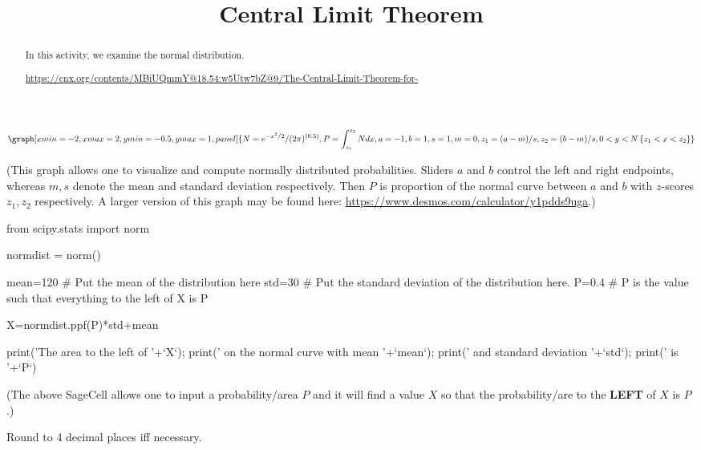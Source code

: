 \documentclass{ximera}
\title{Central Limit Theorem}
\begin{document}
      
\begin{abstract}
      
In this activity, we examine the normal distribution.

\url{https://cnx.org/contents/MBiUQmmY@18.54:w5Utw7bZ@9/The-Central-Limit-Theorem-for-}

      
\end{abstract}
      
\maketitle
 

\begin{onlineOnly}
$$\graph[xmin=-2,xmax=2,ymin=-0.5,ymax=1, panel]{N=e^{-x^2/2}/(2\pi)^{(0.5)}, P=\int_{z_1}^{z_2} N dx, a=-1, b=1, s=1, m=0, z_1=(a-m)/s, z_2=(b-m)/s, 0<y<N\left\{z_1<x<z_2\right\}}$$
\end{onlineOnly}
(This graph allows one to visualize and compute normally distributed probabilities.  Sliders $a$ and $b$ control the left and right endpoints, whereas $m, s$ denote the mean and standard deviation respectively.  Then $P$ is proportion of the normal curve between $a$ and $b$ with $z$-scores $z_1, z_2$ respectively.  A larger version of this graph may be found here: \url{https://www.desmos.com/calculator/y1pdds9uga}.)


\begin{sageCell}
from scipy.stats import norm

normdist = norm()

mean=120 # Put the mean of the distribution here
std=30  # Put the standard deviation of the distribution here.
P=0.4  # P is the value such that everything to the left of X is P

X=normdist.ppf(P)*std+mean

print('The area to the left of '+`X`); print(' on the normal curve with mean '+`mean`); print(' and standard deviation '+`std`); print(' is  '+`P`)
\end{sageCell}
(The above SageCell allows one to input a probability/area $P$ and it will find a value $X$ so that the probability/are to the \textbf{LEFT} of $X$ is $P$.)


Round to 4 decimal places iff necessary.
\end{document}
